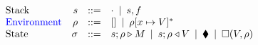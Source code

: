 \documentclass[../plutus-core-specification.tex]{subfiles}
\begin{document}
\begin{figure}[H]
\begin{subfigure}[c]{\linewidth}
    \centering
    \[\begin{array}{lrclr}
        \textrm{Stack} & s      & ::= & \cdot \enspace | \enspace s,f\\
 \textcolor{blue}{ \textrm{Environment}} & \rho & ::= & [] \enspace | \enspace \rho[x \mapsto V]^* \\
        \textrm{State} & \sigma & ::= & s;\rho \triangleright M \enspace | \enspace s;\rho \triangleleft V  \enspace | \enspace \blacklozenge{} \enspace | \enspace \square (V,\rho)
    \end{array}\]

    \label{fig:untyped-cek-frames}
\end{subfigure}
\end{figure}
\end{document}
